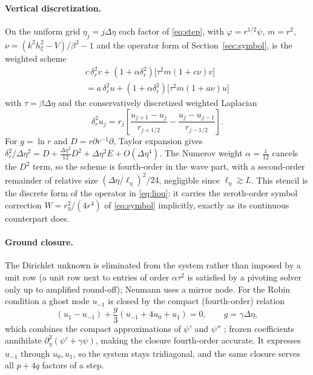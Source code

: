 \documentclass[11pt]{article}
\newcommand{\het}{\nu}
\newcommand{\pd}{\partial}
\begin{document}
\paragraph{Vertical discretization.} On the uniform grid $\eta_j=j\Delta\eta$
each factor of \eqref{eq:step}, with $\varphi=r^{1/2}\psi$,
$m=r^2$, $\het=(k^2h_\xi^2-V)/\beta^2-1$ and the operator form of
Section~\ref{sec:symbol}, is the weighted scheme
\begin{multline}\label{eq:scheme}
c\,\delta^2_rv+(1+\alpha\delta^2_r)\bigl[\tau^2m(1+c\het)v\bigr]\\
=a\,\delta^2_ru+(1+\alpha\delta^2_r)\bigl[\tau^2m(1+a\het)u\bigr]
\end{multline}
with $\tau=\beta\Delta\eta$ and the conservatively discretized weighted
Laplacian
\[
\delta^2_r u_j=r_j\left[\frac{u_{j+1}-u_j}{r_{j+1/2}}-\frac{u_j-u_{j-1}}{r_{j-1/2}}\right] .
\]
For $g=\ln r$ and $D=r\pd r^{-1}\pd$, Taylor expansion gives
$\delta^2_r/\Delta\eta^2=D+\tfrac{\Delta\eta^2}{12}D^2+\Delta\eta^2E+O(\Delta\eta^4)$.
The Numerov weight $\alpha=\tfrac1{12}$ cancels the $D^2$ term, so the scheme
is fourth-order in the wave part, with a second-order remainder of relative
size $(\Delta\eta/\ell_\eta)^2/24$, negligible since $\ell_\eta\gtrsim L$.
This stencil is the discrete form of the operator in \eqref{eq:liou}: it
carries the zeroth-order symbol correction $W=r_\eta^2/(4r^4)$ of
\eqref{eq:symbol} implicitly, exactly as its continuous counterpart does.

\paragraph{Ground closure.} The Dirichlet unknown is eliminated from the
system rather than imposed by a unit row (a unit row next to entries of order
$\alpha\tau^2$ is satisfied by a pivoting solver only up to amplified
round-off); Neumann uses a mirror node. For the Robin condition a ghost node
$u_{-1}$ is closed by the compact (fourth-order) relation
\begin{equation}\label{eq:closure}
(u_1-u_{-1})+\frac g3(u_{-1}+4u_0+u_1)=0,\qquad g=\gamma\Delta\eta ,
\end{equation}
which combines the compact approximations of $\psi'$ and $\psi''$
\cite{lele1992compact}; frozen coefficients annihilate
$\pd_\eta^2(\psi'+\gamma\psi)$, making the closure fourth-order accurate. It
expresses $u_{-1}$ through $u_0,u_1$, so the system stays tridiagonal, and
the same closure serves all $p+4q$ factors of a step.
\end{document}
